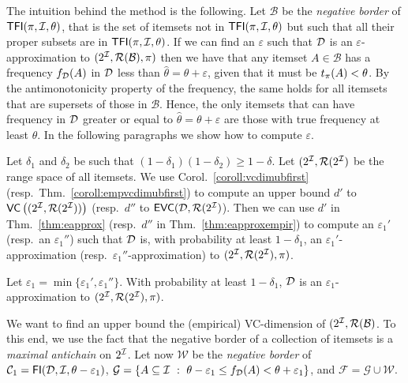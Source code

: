The intuition behind the method is the following. 
Let $\mathcal{B}$ be
the \emph{negative border} of $\mathsf{TFI}(\pi,{\cal I},\theta)$, that is the set of itemsets
not in $\mathsf{TFI}(\pi,{\cal I},\theta)$ but such that all their proper subsets are in
$\mathsf{TFI}(\pi,{\cal I},\theta)$. If we can find an $\varepsilon$ such that ${\cal D}$ is an
$\varepsilon$-approximation to $(2^{\cal I},\mathcal{R}(\mathcal{B}),\pi)$ then %
we have that any itemset
$A\in\mathcal{B}$ has a frequency $f_{\cal D}(A)$ in ${\cal D}$ less than
$\hat{\theta}=\theta+\varepsilon$, given that it must be $t_\pi(A)<\theta$. By the
antimonotonicity property of the frequency, the same holds for all itemsets that
are supersets of those in $\mathcal{B}$. Hence, the only itemsets that can have
frequency in ${\cal D}$ greater or equal to $\hat{\theta}=\theta+\varepsilon$ are
those with true frequency at least $\theta$. In the following paragraphs we show
how to compute $\varepsilon$.

Let $\delta_1$ and $\delta_2$ be such that $(1-\delta_1)(1-\delta_2)\ge
1-\delta$. Let $(2^{\cal I},\mathcal{R}(2^{\cal I})$ be the range space of all itemsets.
We use Corol.~\ref{coroll:vcdimubfirst} (resp.~Thm.~\ref{coroll:empvcdimubfirst}) to
compute an upper bound $d'$ to $\mathsf{VC}\left((2^{\cal I},\mathcal{R}(2^{\cal I}))\right)$ (resp.~$d''$ to
$\mathsf{EVC}({\cal D},\mathcal{R}(2^{\cal I})$). Then we can use $d'$ in Thm.~\ref{thm:eapprox} (resp.~$d''$ in
Thm.~\ref{thm:eapproxempir}) to compute an $\varepsilon_1'$ (resp.~an
$\varepsilon_1''$) such that ${\cal D}$ is, with probability at
least $1-\delta_1$, an $\varepsilon_1'$-approximation
(resp.~$\varepsilon_1''$-approximation) to $(2^{\cal I},\mathcal{R}(2^{\cal I}),\pi)$.
\begin{fact}
Let
$\varepsilon_1=\min\{\varepsilon_1',\varepsilon_1''\}$. %
With probability at least $1-\delta_1$, ${\cal D}$ is an
$\varepsilon_1$-approximation to $(2^{\cal I},\mathcal{R}(2^{\cal I}),\pi)$.
\end{fact}

We want to find an upper bound the (empirical) VC-dimension of
$(2^{\cal I},\mathcal{R}(\mathcal{B})$. To this end, we use the fact that the negative border of a
collection of itemsets is a \emph{maximal
antichain} on $2^{\cal I}$. %
Let now $\mathcal{W}$ be the \emph{negative
border} of $\mathcal{C}_1=\mathsf{FI}({\cal D},{\cal I},\theta-\varepsilon_1)$, 
$\mathcal{G}=\{A\subseteq{\cal I} ~:~ \theta-\varepsilon_1\le
f_{\cal D}(A)<\theta+\varepsilon_1\}$, and $\mathcal{F}=\mathcal{G}\cup\mathcal{W}$.

